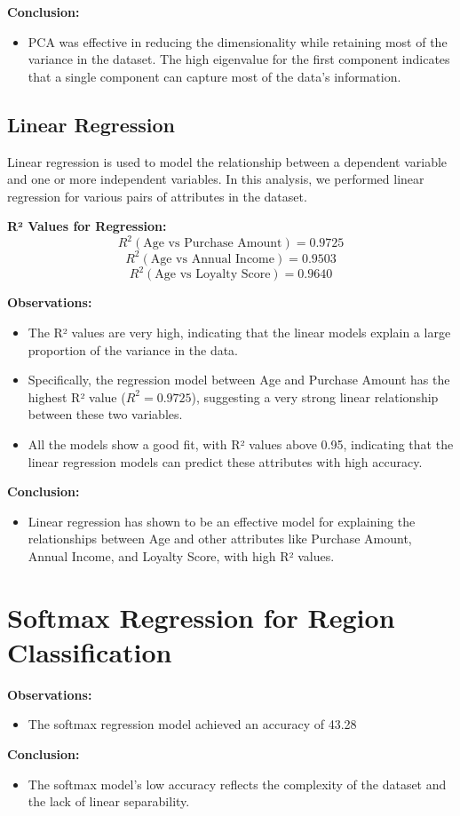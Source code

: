 \documentclass[11pt]{article}
\begin{document}
\textbf{Conclusion:}
\begin{itemize}
    \item PCA was effective in reducing the dimensionality while retaining most of the variance in the dataset. The high eigenvalue for the first component indicates that a single component can capture most of the data's information.
\end{itemize}


\subsection{Linear Regression}

Linear regression is used to model the relationship between a dependent variable and one or more independent variables. In this analysis, we performed linear regression for various pairs of attributes in the dataset.

\textbf{R² Values for Regression:}
\[
R^2(\text{Age vs Purchase Amount}) = 0.9725
\]
\[
R^2(\text{Age vs Annual Income}) = 0.9503
\]
\[
R^2(\text{Age vs Loyalty Score}) = 0.9640
\]


\textbf{Observations:}
\begin{itemize}
    \item The R² values are very high, indicating that the linear models explain a large proportion of the variance in the data.
    \item Specifically, the regression model between Age and Purchase Amount has the highest R² value (\(R^2 = 0.9725\)), suggesting a very strong linear relationship between these two variables.
    \item All the models show a good fit, with R² values above 0.95, indicating that the linear regression models can predict these attributes with high accuracy.
\end{itemize}

\textbf{Conclusion:}
\begin{itemize}
    \item Linear regression has shown to be an effective model for explaining the relationships between Age and other attributes like Purchase Amount, Annual Income, and Loyalty Score, with high R² values.
\end{itemize}


\section{Softmax Regression for Region Classification}
\textbf{Observations:}
\begin{itemize}
    \item The softmax regression model achieved an accuracy of 43.28%
\end{itemize}
\textbf{Conclusion:}
\begin{itemize}
    \item The softmax model's low accuracy reflects the complexity of the dataset and the lack of linear separability.
\end{itemize}
\end{document}
